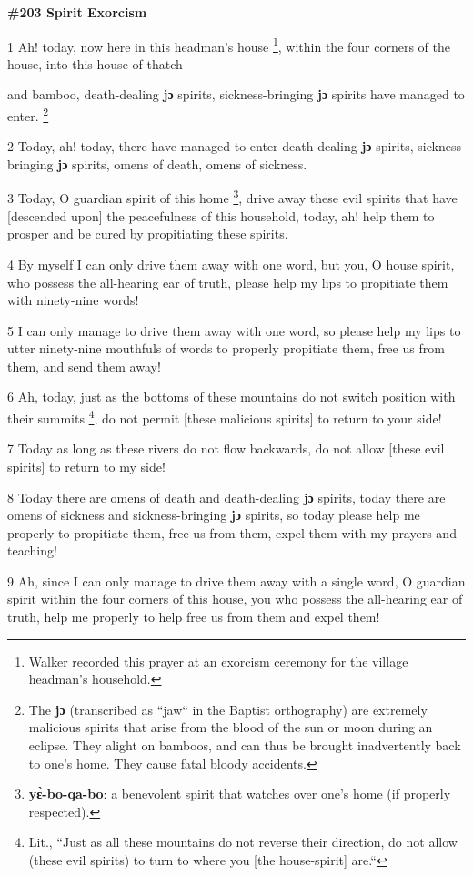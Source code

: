 
\textbf{\#203 Spirit Exorcism}

1 Ah! today, now here in this headman's house \footnote{Walker recorded this prayer at an exorcism ceremony for the village headman's household.}, within the four corners of the
house, into this house of thatch

and bamboo,  death-dealing\textbf{ jɔ }spirits, sickness-bringing\textbf{ jɔ}
spirits have managed to enter. \footnote{The \textbf{jɔ} (transcribed as ``jaw`` in the Baptist orthography) are extremely malicious spirits that arise from the blood of the sun or moon during an eclipse. They alight on bamboos, and can thus be brought inadvertently back to one's home. They cause fatal bloody accidents.}

2 Today, ah! today, there have managed to enter death-dealing \textbf{jɔ} spirits,
sickness-bringing\textbf{ jɔ} spirits, omens of death, omens of sickness.

3 Today, O guardian spirit of this home \footnote{\textbf{yɛ̀-bo-qa-bo}: a benevolent spirit that watches over one's home (if properly respected).}, drive away these evil spirits that
have [descended upon] the peacefulness of this household, today, ah! help them
to prosper and be cured by propitiating these spirits.

4 By myself I can only drive them away with one word, but you, O house spirit,
who  possess the all-hearing ear of truth, please help my lips to propitiate them
with ninety-nine words!

5 I can only manage to drive them away with one word, so please help my lips to
utter ninety-nine mouthfuls of words to properly propitiate them, free us from
them, and send them away!

6 Ah, today, just as the bottoms of these mountains do not switch position with
their summits \footnote{Lit., ``Just as all these mountains do not reverse their direction, do not allow (these evil spirits) to turn to where you [the house-spirit] are.``},  do not permit [these malicious spirits] to return to your side!

7 Today as long as these rivers do not flow backwards, do not allow [these evil
spirits] to return to my side!

8 Today there are omens of death and death-dealing\textbf{ jɔ }spirits, today
there are omens of sickness and sickness-bringing\textbf{ jɔ }spirits, so today
please help me properly to propitiate them, free us from them, expel them with
my prayers and teaching!

9 Ah, since I can only manage to drive them away with a single word, O guardian
spirit within the four corners of this house, you who possess the all-hearing ear
of truth, help me properly to help free us from them and expel them!

